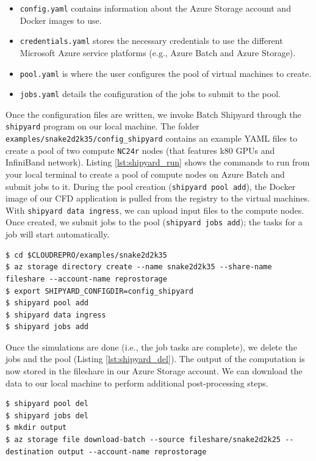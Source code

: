 \documentclass[10pt,journal,compsoc]{IEEEtran}
\begin{document}
\begin{itemize}
    \item \texttt{config.yaml} contains information about the Azure Storage account and Docker images to use.
    \item \texttt{credentials.yaml} stores the necessary credentials to use the different Microsoft Azure service platforms (e.g., Azure Batch and Azure Storage).
    \item \texttt{pool.yaml} is where the user configures the pool of virtual machines to create.
    \item \texttt{jobs.yaml} details the configuration of the jobs to submit to the pool.
\end{itemize}

Once the configuration files are written, we invoke Batch Shipyard through the \texttt{shipyard} program on our local machine.
The folder \texttt{examples/snake2d2k35/config\_shipyard} contains an example YAML files to create a pool of two compute \texttt{NC24r} nodes (that features k80 GPUs and InfiniBand network).
Listing \ref{lst:shipyard_run} shows the commands to run from your local terminal to create a pool of compute nodes on Azure Batch and submit jobs to it.
During the pool creation (\texttt{shipyard pool add}), the Docker image of our CFD application is pulled from the registry to the virtual machines.
With \texttt{shipyard data ingress}, we can upload input files to the compute nodes.
Once created, we submit jobs to the pool (\texttt{shipyard jobs add}); the tasks for a job will start automatically.

\begin{lstlisting}[label=lst:shipyard_run,caption={Create a pool with Batch Shipyard and submit jobs to it.}]
$ cd $CLOUDREPRO/examples/snake2d2k35
$ az storage directory create --name snake2d2k35 --share-name fileshare --account-name reprostorage
$ export SHIPYARD_CONFIGDIR=config_shipyard
$ shipyard pool add
$ shipyard data ingress
$ shipyard jobs add
\end{lstlisting}

Once the simulations are done (i.e., the job tasks are complete), we delete the jobs and the pool (Listing \ref{lst:shipyard_del}).
The output of the computation is now stored in the fileshare in our Azure Storage account.
We can download the data to our local machine to perform additional post-processing steps.

\begin{lstlisting}[label=lst:shipyard_del,caption={Delete the pool and jobs, and download to output to a local machine.}]
$ shipyard pool del
$ shipyard jobs del
$ mkdir output
$ az storage file download-batch --source fileshare/snake2d2k25 --destination output --account-name reprostorage
\end{lstlisting}
\end{document}
